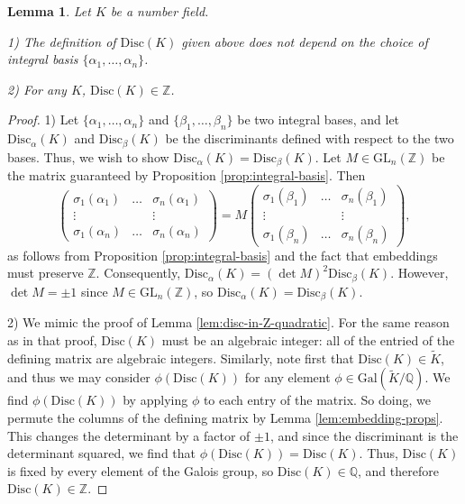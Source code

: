 \documentclass[12pt]{amsart}
\newtheorem{lemma}[theorem]{Lemma}
\theoremstyle{definition} \newtheorem*{notation}{Notation}
\theoremstyle{remark} \newtheorem*{remark}{Remark}
\theoremstyle{remark} \newtheorem*{example}{Example}
\theoremstyle{definition} \newtheorem*{definition}{Definition}
\numberwithin{equation}{section}
\numberwithin{theorem}{section}
\begin{document}
	\begin{lemma}
		Let $K$ be a number field.
		
		1) The definition of $\mathrm{Disc}(K)$ given above does not depend on the choice of integral basis $\{\alpha_1,\dots,\alpha_n\}$.
		
		2) For any $K$, $\mathrm{Disc}(K) \in \mathbb{Z}$.
	\end{lemma}
	\begin{proof}
		1) Let $\{\alpha_1,\dots,\alpha_n\}$ and $\{\beta_1,\dots,\beta_n\}$ be two integral bases, and let $\mathrm{Disc}_\alpha(K)$ and $\mathrm{Disc}_\beta(K)$ be the discriminants defined with respect to the two bases.  Thus, we wish to show $\mathrm{Disc}_\alpha(K) = \mathrm{Disc}_\beta(K)$.  Let $M \in \mathrm{GL}_n(\mathbb{Z})$ be the matrix guaranteed by Proposition \ref{prop:integral-basis}. Then
			\[
				\begin{pmatrix}
					\sigma_1(\alpha_1) & \dots & \sigma_n(\alpha_1) \\
					\vdots & & \vdots \\
					\sigma_1(\alpha_n) & \dots & \sigma_n(\alpha_n)
				\end{pmatrix}
				= M
				\begin{pmatrix}
				\sigma_1(\beta_1) & \dots & \sigma_n(\beta_1) \\
					\vdots & & \vdots \\
					\sigma_1(\beta_n) & \dots & \sigma_n(\beta_n)
				\end{pmatrix},
			\]
		as follows from Proposition \ref{prop:integral-basis} and the fact that embeddings must preserve $\mathbb{Z}$.  Consequently, $\mathrm{Disc}_\alpha(K) = (\det M)^2 \mathrm{Disc}_\beta(K)$.  However, $\det M = \pm 1$ since $M \in \mathrm{GL}_n(\mathbb{Z})$, so $\mathrm{Disc}_\alpha(K) = \mathrm{Disc}_\beta(K)$.
		
		2) We mimic the proof of Lemma \ref{lem:disc-in-Z-quadratic}.  For the same reason as in that proof, $\mathrm{Disc}(K)$ must be an algebraic integer: all of the entried of the defining matrix are algebraic integers.  Similarly, note first that $\mathrm{Disc}(K) \in \widetilde{K}$, and thus we may consider $\phi(\mathrm{Disc}(K))$ for any element $\phi \in \mathrm{Gal}(\widetilde{K}/\mathbb{Q})$.  We find $\phi(\mathrm{Disc}(K))$ by applying $\phi$ to each entry of the matrix.  So doing, we permute the columns of the defining matrix by Lemma \ref{lem:embedding-props}.  This changes the determinant by a factor of $\pm 1$, and since the discriminant is the determinant squared, we find that $\phi(\mathrm{Disc}(K)) = \mathrm{Disc}(K)$.  Thus, $\mathrm{Disc}(K)$ is fixed by every element of the Galois group, so $\mathrm{Disc}(K) \in \mathbb{Q}$, and therefore $\mathrm{Disc}(K) \in \mathbb{Z}$.
	\end{proof}
	
\end{document}
